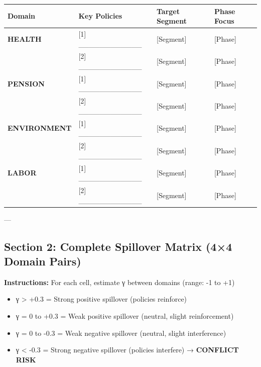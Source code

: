 \begin{center}
\small
\begin{tabular}{@{}p{2cm}p{2.5cm}p{2.5cm}p{2.5cm}@{}}
\toprule
\textbf{Domain} & \textbf{Key Policies} & \textbf{Target Segment} & \textbf{Phase Focus} \\
\midrule
\textbf{HEALTH} & [1] \_\_\_\_\_\_\_\_\_\_\_\_ & [Segment] & [Phase] \\
 & [2] \_\_\_\_\_\_\_\_\_\_\_\_ & [Segment] & [Phase] \\
\midrule
\textbf{PENSION} & [1] \_\_\_\_\_\_\_\_\_\_\_\_ & [Segment] & [Phase] \\
 & [2] \_\_\_\_\_\_\_\_\_\_\_\_ & [Segment] & [Phase] \\
\midrule
\textbf{ENVIRONMENT} & [1] \_\_\_\_\_\_\_\_\_\_\_\_ & [Segment] & [Phase] \\
 & [2] \_\_\_\_\_\_\_\_\_\_\_\_ & [Segment] & [Phase] \\
\midrule
\textbf{LABOR} & [1] \_\_\_\_\_\_\_\_\_\_\_\_ & [Segment] & [Phase] \\
 & [2] \_\_\_\_\_\_\_\_\_\_\_\_ & [Segment] & [Phase] \\
\midrule
\end{tabular}
\end{center}

---


\subsection*{Section 2: Complete Spillover Matrix (4×4 Domain Pairs)}

\textbf{Instructions:} For each cell, estimate γ between domains (range: -1 to +1)
\begin{itemize}[nosep]
\item γ > +0.3 = Strong positive spillover (policies reinforce)
\item γ = 0 to +0.3 = Weak positive spillover (neutral, slight reinforcement)
\item γ = 0 to -0.3 = Weak negative spillover (neutral, slight interference)
\item γ < -0.3 = Strong negative spillover (policies interfere) → \textbf{CONFLICT RISK}
\end{itemize}

